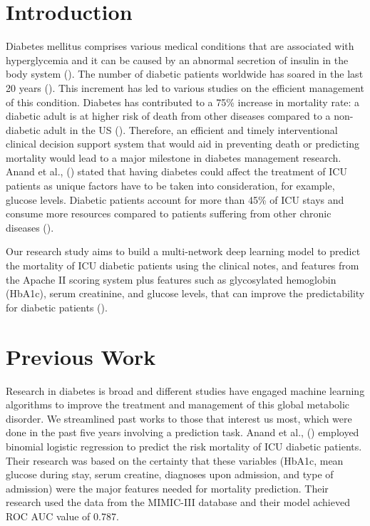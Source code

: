 \documentclass{sigkddExp}
\begin{document}
\section{Introduction}
Diabetes mellitus comprises various medical conditions that are associated with hyperglycemia and it can 
be caused by an abnormal secretion of insulin in the body system (\cite{egan}). 
The number of diabetic patients worldwide has soared in the last 20 years (\cite{zimmet}). 
This increment has led to various studies on the efficient management of this condition. 
Diabetes has contributed to a 75\% increase in mortality rate:
a diabetic adult is at higher risk of death from other diseases compared to a 
non-diabetic adult in the US (\cite{gregg}). Therefore,
an efficient and timely interventional clinical decision support system that 
would aid in preventing death or predicting mortality would 
lead to a major milestone in diabetes management research. Anand et al., (\cite{anand}) stated 
that having diabetes could affect the treatment 
of ICU patients as unique factors have to be taken into consideration, for example,
glucose levels. Diabetic patients account for more than 45\% of ICU stays and consume 
more resources compared to patients suffering from 
other chronic diseases (\cite{anand}). 
 
Our research study aims to build a multi-network deep learning model to predict the mortality 
of ICU diabetic patients using the clinical notes,
and features from the Apache II scoring system plus features such as glycosylated hemoglobin (HbA1c),
serum creatinine, and glucose levels, that can improve the predictability for diabetic patients (\cite{anand}).

\section{Previous Work}
Research in diabetes is broad and different studies have engaged machine learning algorithms to improve 
the treatment and management of this global metabolic disorder. We streamlined past works to those that 
interest us most, which were done in the past five years involving a prediction task.
Anand et al., (\cite{anand}) employed binomial logistic regression to predict the risk mortality of ICU diabetic patients.  
Their research was based on the certainty that these variables (HbA1c, mean glucose during stay, serum creatine, 
diagnoses upon admission, and type of admission) were the major features needed for mortality prediction. 
Their research used the data from the MIMIC-III database and their model achieved ROC AUC value of 0.787.
\end{document}
